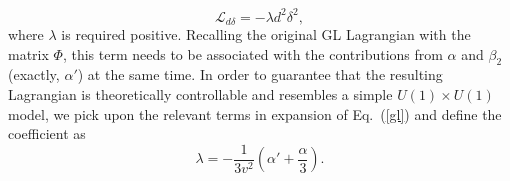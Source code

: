 \documentclass[12pt]{article}
\begin{document}
\begin{equation}
  \label{eq:vortoninter}
  \mathcal{L}_{d\delta} = -\lambda d^2 \delta^2,
\end{equation}
where $\lambda$ is required positive.
Recalling the original GL Lagrangian with the matrix $\Phi$, this term needs to
be associated with the contributions from $\alpha$ and $\beta_2$ (exactly, $\alpha'$) at the same time. In order to guarantee
that the resulting Lagrangian is theoretically controllable and resembles a
simple $U(1) \times U(1)$ model, we pick upon the relevant terms
in expansion of Eq.~(\ref{gl}) and define the coefficient as
\begin{equation}
  \label{eq:vortoninter1}
  \lambda = -\frac{1}{3 v^2}(\alpha' +\frac{\alpha}{3}).
\end{equation}
\end{document}
